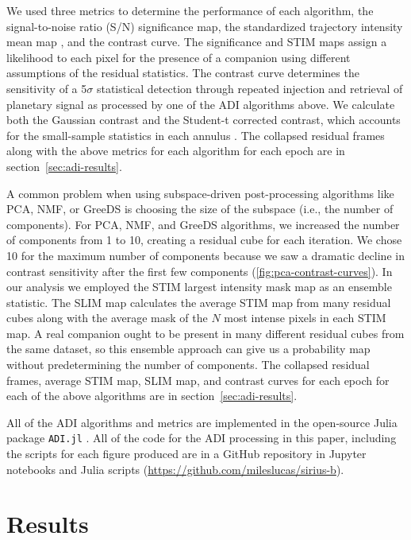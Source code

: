 \documentclass[twocolumn,linenumbers]{aastex631}
\begin{document}
We used three metrics to determine the performance of each algorithm, the signal-to-noise ratio (S/N) significance map, the standardized trajectory intensity mean map \citep[STIM map;][]{pairet_stim_2019}, and the contrast curve. The significance and STIM maps assign a likelihood to each pixel for the presence of a companion using different assumptions of the residual statistics. The contrast curve determines the sensitivity of a 5$\sigma$ statistical detection through repeated injection and retrieval of planetary signal as processed by one of the ADI algorithms above. We calculate both the Gaussian contrast and the Student-t corrected contrast, which accounts for the small-sample statistics in each annulus \citep{mawet_fundamental_2014}. The collapsed residual frames along with the above metrics for each algorithm for each epoch are in section~\ref{sec:adi-results}.

A common problem when using subspace-driven post-processing algorithms like PCA, NMF, or GreeDS is choosing the size of the subspace (i.e., the number of components). For PCA, NMF, and GreeDS algorithms, we increased the number of components from 1 to 10, creating a residual cube for each iteration. We chose 10 for the maximum number of components because we saw a dramatic decline in contrast sensitivity after the first few components (\cref{fig:pca-contrast-curves}). In our analysis we employed the STIM largest intensity mask map \citep[SLIM map;][]{pairet_signal_2020} as an ensemble statistic. The SLIM map calculates the average STIM map from many residual cubes along with the average mask of the $N$ most intense pixels in each STIM map. A real companion ought to be present in many different residual cubes from the same dataset, so this ensemble approach can give us a probability map without predetermining the number of components. The collapsed residual frames, average STIM map, SLIM map, and contrast curves for each epoch for each of the above algorithms are in section~\ref{sec:adi-results}.

All of the ADI algorithms and metrics are implemented in the open-source Julia package \texttt{ADI.jl} \citep{lucas_adijl_2020}. All of the code for the ADI processing in this paper, including the scripts for each figure produced are in a GitHub repository in Jupyter notebooks and Julia scripts (\href{https://github.com/mileslucas/sirius-b}{https://github.com/mileslucas/sirius-b}).

\section{Results} \label{sec:results}
\end{document}
